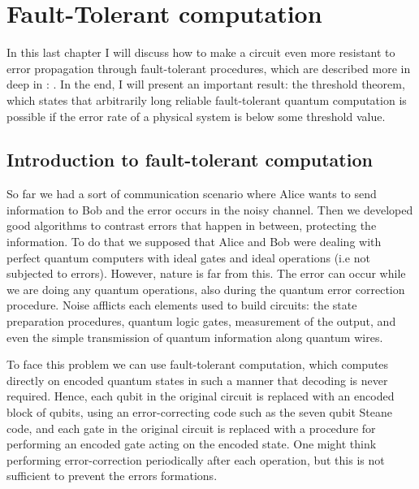 \chapter{Fault-Tolerant computation}
In this last chapter I will discuss how to make a circuit even more resistant to error propagation through fault-tolerant procedures, which are described more in deep in : \cite{DanielGottesman}\cite{gottesman2009introduction}. In the end, I will present an important result: the threshold theorem, which states that arbitrarily long reliable fault-tolerant quantum computation is possible if the error rate of a physical system is below some threshold value. 




\section{Introduction to fault-tolerant computation}
So far we had a sort of communication scenario where Alice wants to send information to Bob and the error occurs in the noisy channel. 
Then we developed good algorithms to contrast errors that happen in between, protecting the information.
To do that we supposed that Alice and Bob were dealing with perfect quantum computers with ideal gates and ideal operations (i.e not subjected to errors). 
However, nature is far from this. 
The error can occur while we are doing any quantum operations, also during the quantum error correction procedure.
Noise afflicts each elements used to build circuits: the state preparation procedures, quantum logic gates, measurement of the output, and even the simple transmission of quantum information along quantum wires.

To face this problem we can use fault-tolerant computation, which computes directly on encoded quantum states in such a manner that decoding is never required. Hence, each qubit in the original circuit is replaced with an encoded block of qubits, using an error-correcting code such as the seven qubit Steane code, and each gate in the original circuit is replaced with a procedure for performing an encoded gate acting on the encoded state. 
One might think performing error-correction periodically after each operation, but this is not sufficient to prevent the errors formations.


